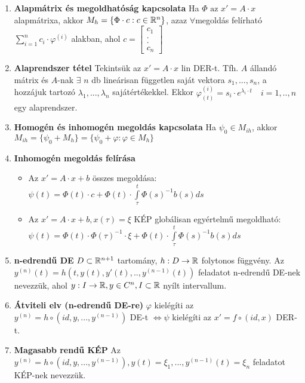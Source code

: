 \documentclass{article}
\begin{document}
\begin{enumerate}
	\item\textbf{Alapmátrix és megoldhatóság kapcsolata}\br
	Ha $\Phi\text{ az }x'=A\cdot x$ alapmátrixa, akkor $M_h=\{\Phi\cdot c : c\in\mathbb{R}^n\}$,
	azaz $\forall$megoldás felírható\br
	$\sum\limits_{i=1}^n c_i\cdot\varphi^{(i)}$ alakban, ahol $c=
	\begin{bmatrix}
	c_1 \\ . \\ . \\ c_n
	\end{bmatrix}$
	
	\item\textbf{Alaprendszer tétel}\br
	Tekintsük az $x'=A\cdot x$ lin DER-t. Tfh. $A$ állandó mátrix és $A$-nak $\exists$ $n$
	db lineárisan független saját vektora $s_1,...,s_n$, a hozzájuk tartozó
	$\lambda_1,...,\lambda_n$ sajátértékekkel.\br
	Ekkor $\varphi^{(i)}_{(t)}=s_i\cdot e^{\lambda_i\cdot t}\quad i=1,..,n$ egy alaprendszer.
	
	\item\textbf{Homogén és inhomogén megoldás kapcsolata}\br
	Ha $\psi_0\in M_{ih}$, akkor $M_{ih}=\{\psi_0+M_h\}=\{\psi_0+\varphi:\varphi\in M_h\}$
	
	\item\textbf{Inhomogén megoldás felírása}
	\begin{itemize}
		\item Az $x'=A\cdot x+b$ összes megoldása: $\psi(t)=\Phi(t)\cdot c+\Phi(t)\cdot
		\int\limits_{\tau}^t \Phi(s)^{-1}b(s)ds$
		\item Az $x'=A\cdot x+b, x(\tau)=\xi$ KÉP globálisan egyértelmű megoldható:\br
		$\psi(t)=\Phi(t)\cdot\Phi(\tau)^{-1}\cdot\xi+\Phi(t)\cdot\int\limits_{\tau}^t
		\Phi(s)^{-1}b(s)ds$
	\end{itemize}
	\newpage
	
	\item\textbf{n-edrendű DE}\br
	$D\subset\mathbb{R}^{n+1}$ tartomány, $h:D\rightarrow\mathbb{R}$ folytonos függvény.\br
	Az $y^{(n)}(t)=h(t,y(t),y'(t),..,y^{(n-1)}(t))$ feladatot n-edrendű DE-nek nevezzük, ahol\br
	$y:I\rightarrow\mathbb{R},y\in C^n,I\subset\mathbb{R}$ nyílt intervallum.
	
	\item\textbf{Átviteli elv (n-edrendű DE-re)}\br
	$\varphi$ kielégíti az $y^{(n)}=h\circ(id,y,...,y^{(n-1)})$ DE-t $\Leftrightarrow\psi$
	kielégíti az $x'=f\circ(id,x)$ DER-t.
	
	\item\textbf{Magasabb rendű KÉP}\br
	Az $y^{(n)}=h\circ(id,y,...,y^{(n-1)}), y(t)=\xi_1,...,y^{(n-1)}(t)=\xi_n$
	feladatot KÉP-nek nevezzük.
	

\end{enumerate}
\end{document}
